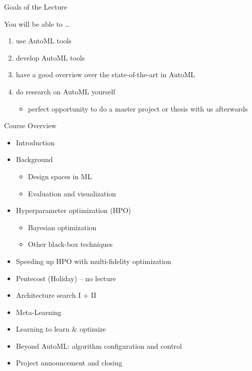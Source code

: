 \begin{frame}[c]{Goals of the Lecture}

You will be able to \ldots
\begin{enumerate}
  \item use AutoML tools
  \smallskip
  \item develop AutoML tools
  \smallskip
  \item have a good overview over the state-of-the-art in AutoML
  \smallskip
  \item do research on AutoML yourself
  \begin{itemize}
    \item perfect opportunity to do a master project or thesis with us afterwards
  \end{itemize}
\end{enumerate}

\end{frame}
\begin{frame}[c]{Course Overview}

\begin{itemize}
	\item Introduction
	\item Background
	\begin{itemize}
		\item Design spaces in ML
		\item Evaluation and visualization
	\end{itemize}
	\item Hyperparameter optimization (HPO)
	\begin{itemize}
	  \item Bayesian optimization
	  \item Other black-box techniques
	\end{itemize}
	\item Speeding up HPO with multi-fidelity optimization
	\item Pentecost (Holiday) -- no lecture
	\item Architecture search I + II
	\item Meta-Learning
	\item Learning to learn $\&$ optimize
	\item Beyond AutoML: algorithm configuration and control
	\item Project announcement and closing
\end{itemize}


\end{frame}
